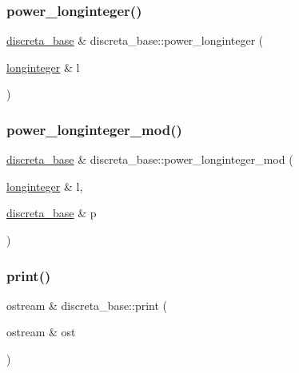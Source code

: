 \mbox{\label{classdiscreta__base_aa62919063915230ba88a0a070a38f3d6}} 
\subsubsection{\texorpdfstring{power\+\_\+longinteger()}{power\_longinteger()}}
{\footnotesize\ttfamily \mbox{\hyperlink{classdiscreta__base}{discreta\+\_\+base}} \& discreta\+\_\+base\+::power\+\_\+longinteger (\begin{DoxyParamCaption}\item[{\mbox{\hyperlink{classlonginteger}{longinteger}} \&}]{l }\end{DoxyParamCaption})}

\mbox{\label{classdiscreta__base_a13cf1612186baa2104f55978cbf56873}} 
\subsubsection{\texorpdfstring{power\+\_\+longinteger\+\_\+mod()}{power\_longinteger\_mod()}}
{\footnotesize\ttfamily \mbox{\hyperlink{classdiscreta__base}{discreta\+\_\+base}} \& discreta\+\_\+base\+::power\+\_\+longinteger\+\_\+mod (\begin{DoxyParamCaption}\item[{\mbox{\hyperlink{classlonginteger}{longinteger}} \&}]{l,  }\item[{\mbox{\hyperlink{classdiscreta__base}{discreta\+\_\+base}} \&}]{p }\end{DoxyParamCaption})}

\mbox{\label{classdiscreta__base_a036e48bc058347046fc9b73dd0951478}} 
\subsubsection{\texorpdfstring{print()}{print()}}
{\footnotesize\ttfamily ostream \& discreta\+\_\+base\+::print (\begin{DoxyParamCaption}\item[{ostream \&}]{ost }\end{DoxyParamCaption})\hspace{0.3cm}{\ttfamily [virtual]}}



